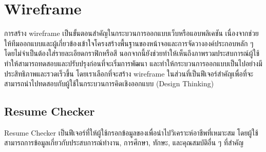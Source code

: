 \section{Wireframe}
การสร้าง wireframe เป็นขั้นตอนสำคัญในกระบวนการออกแบบเว็บหรือแอบพลิเคชัน เนื่องจากช่วยให้ทีมออกแบบและผู้เกี่ยวข้องเข้าใจโครงสร้างพื้นฐานของหน้าจอและการจัดวางองค์ประกอบหลัก ๆ โดยไม่จำเป็นต้องใส่รายละเอียดกราฟิกหรือสี นอกจากนี้ยังช่วยทำให้เห็นถึงภาพรวมประสบการณ์ผู้ใช้
ทำให้สามารถทดสอบและปรับปรุงก่อนที่จะเริ่มการพัฒนา และทำให้กระบวนการออกแบบเป็นไปอย่างมีประสิทธิภาพและรวดเร็วขึ้น โดยเราเลือกที่จะสร้าง wireframe ในส่วนที่เป็นฟีเจอร์สำคัญเพื่อที่จะสามารถนำไปทดสอบกับผู้ใช้ในกระบวนการคิดเชิงออกแบบ (Design Thinking)
\subsection {Resume Checker}
Resume Checker เป็นฟีเจอร์ที่ให้ผู้ใช้กรอกข้อมูลของเพื่อนำไปวิเคราะห์อาชีพที่เหมาะสม โดยผู้ใช้สามารถการข้อมูลเกี่ยวกับประสบการณ์ทำงาน, การศึกษา, ทักษะ, และคุณสมบัติอื่น ๆ ที่สำคัญ
